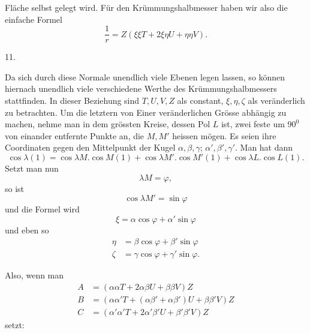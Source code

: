 %
Fläche selbst gelegt wird. Für den Krümmungshalbmesser haben wir also die einfache Formel
\[
\frac1r=Z(\xi\xi T+2\xi\eta U+\eta\eta V).
\]

\begin{center}11.\end{center}
\noindent\hspace*{1.2em}Da sich durch diese Normale unendlich viele Ebenen legen lassen, so können hiernach unendlich viele verschiedene Werthe des Krümmungshalbmessers stattfinden. In dieser Beziehung sind $T,U,V,Z$ als constant, $\xi,\eta,\zeta$ als veränderlich zu betrachten. Um die letztern von Einer veränderlichen Grösse abhängig zu machen, nehme man in dem grössten Kreise, dessen Pol $L$ ist, zwei feste um $90^{0}$ von einander entfernte Punkte an, die $M,M'$ heissen mögen. Es seien ihre Coordinaten gegen den Mittelpunkt der Kugel $\alpha,\beta,\gamma$; $\alpha',\beta',\gamma'$. Man hat dann
\[
\cos\lambda(1)=\cos\lambda M.\cos M(1)+\cos\lambda M'.\cos M'(1)+\cos\lambda L.\cos L(1).
\]
Setzt man nun
\[
\lambda M=\varphi,
\]
so ist
\[
\cos\lambda M'=\sin\varphi
\]
und die Formel wird
\[
\xi=\alpha\cos\varphi+\alpha'\sin\varphi
\]
und eben so
\[
\begin{aligned}
\eta&=\beta\cos\varphi+\beta'\sin\varphi\\
\zeta&=\gamma\cos\varphi+\gamma'\sin\varphi.
\end{aligned}
\]

Also, wenn man
\[
\begin{aligned}
A&=(\alpha\alpha T+2\alpha\beta U+\beta\beta V)Z\\
B&=(\alpha\alpha'T+(\alpha\beta'+\alpha\beta')U+\beta\beta'V)Z\\
C&=(\alpha'\alpha'T+2\alpha'\beta'U+\beta'\beta'V)Z
\end{aligned}
\]
setzt:
